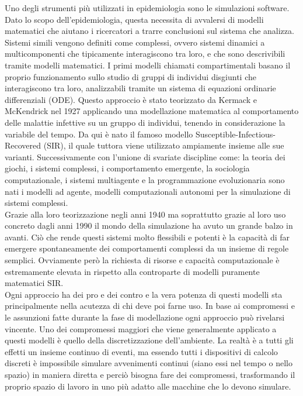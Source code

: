 Uno degli strumenti più utilizzati in epidemiologia sono le simulazioni software. 
Dato lo scopo dell’epidemiologia, questa necessita di avvalersi di modelli matematici che aiutano 
i ricercatori a trarre conclusioni sul sistema che analizza. 
Sistemi simili vengono definiti come complessi, ovvero sistemi dinamici a multicomponenti 
che tipicamente interagiscono tra loro, e che sono descrivibili tramite modelli matematici. 
I primi modelli chiamati compartimentali basano il proprio funzionamento sullo studio di 
gruppi di individui disgiunti che interagiscono tra loro, analizzabili 
tramite un sistema di equazioni ordinarie differenziali (ODE). 
Questo approccio è stato teorizzato da Kermack e McKendrick nel 1927 applicando 
una modellazione matematica al comportamento delle malattie infettive su un gruppo di individui, 
tenendo in considerazione la variabile del tempo. 
Da qui è nato il famoso modello Susceptible-Infectious-Recovered (SIR), 
il quale tuttora viene utilizzato ampiamente insieme alle sue varianti. 
Successivamente con l’unione di svariate discipline come: 
la teoria dei giochi, i sistemi complessi, i comportamento emergente, 
la sociologia computazionale, i sistemi multiagente e la programmazione evoluzionaria 
sono nati i modelli ad agente, modelli computazionali autonomi per la simulazione di sistemi complessi. 
\\

Grazie alla loro teorizzazione negli anni 1940 ma soprattutto grazie al loro uso concreto dagli 
anni 1990 il mondo della simulazione ha avuto un grande balzo in avanti. 
Ciò che rende questi sistemi molto flessibili e potenti è la capacità di 
far emergere spontaneamente dei comportamenti complessi da un insieme di regole semplici. 
Ovviamente però la richiesta di risorse e capacità computazionale è estremamente elevata 
in rispetto alla controparte di modelli puramente matematici SIR. 
\\

Ogni approccio ha dei pro e dei contro e la vera potenza di questi modelli sta principalmente 
nella acutezza di chi deve poi farne uso. In base ai compromessi e le assunzioni fatte durante 
la fase di modellazione ogni approccio può rivelarsi vincente. 
Uno dei compromessi maggiori che viene generalmente applicato a questi modelli è 
quello della discretizzazione dell’ambiente. La realtà è a tutti gli effetti un insieme 
continuo di eventi, ma essendo tutti i dispositivi di calcolo discreti è impossibile simulare avvenimenti 
continui (siano essi nel tempo o nello spazio) in maniera diretta e perciò bisogna fare dei compromessi, 
trasformando il proprio spazio di lavoro in uno più adatto alle macchine che lo devono simulare. 

